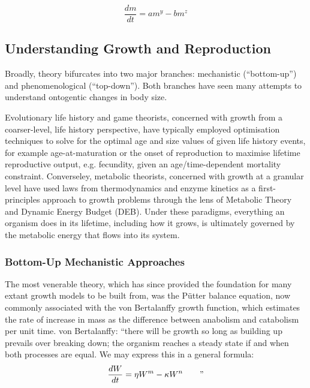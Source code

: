\documentclass[a4paper]{article} %
\begin{document}
        \begin{equation}
            \frac{dm}{dt} = am^y - bm^z
        \end{equation}
                
        \subsection{Understanding Growth and Reproduction}
        Broadly, theory bifurcates into two major branches: mechanistic (``bottom-up'') and phenomenological (``top-down''). Both branches have seen many attempts to understand ontogentic changes in body size.  
        
        Evolutionary life history and game theorists, concerned with growth from a coarser-level, life history perspective, have typically employed optimisation techniques to solve for the optimal age and size values of given life history events, for example age-at-maturation or the onset of reproduction to maximise lifetime reproductive output, e.g. fecundity, given an age/time-dependent mortality constraint. Converseley, metabolic theorists, concerned with growth at a granular level have used laws from thermodynamics and enzyme kinetics as a first-principles approach to growth problems through the lens of Metabolic Theory and Dynamic Energy Budget (DEB). Under these paradigms, everything an organism does in its lifetime, including how it grows, is ultimately governed by the metabolic energy that flows into its system. 

        \subsubsection{Bottom-Up Mechanistic Approaches}
        The most venerable theory, which has since provided the foundation for many extant growth models to be built from, was the P\"{u}tter balance equation, now commonly associated with the von Bertalanffy growth function, which estimates the rate of increase in mass as the difference between anabolism and catabolism per unit time. \autocite{Putter1920, vonBert1938, VonBertalanffy1957,Marshall2019b}
        von Bertalanffy: ``there will be growth so long as building up prevails over breaking down; the organism reaches a steady state if and when both processes are equal. We may express this in a general formula: 
        \begin{equation}
            \frac{dW}{dt} = \eta W^m - \kappa W^n \text{\qquad ''}
        \end{equation}
\end{document}
